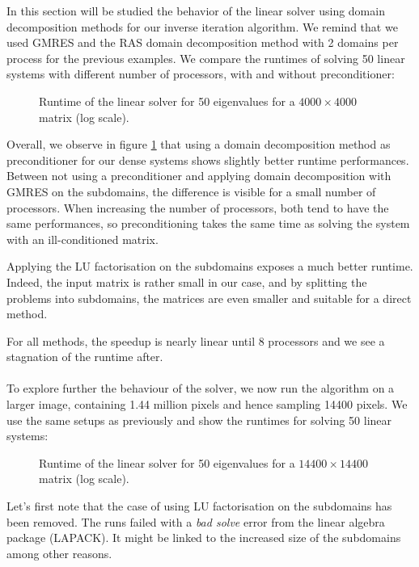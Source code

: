 In this section will be studied the behavior of the linear solver using domain decomposition methods for our inverse iteration algorithm.
We remind that we used GMRES and the RAS domain decomposition method with 2 domains per process for the previous examples.
We compare the runtimes of solving 50 linear systems with different number of processors, with and without preconditioner:

\begin{figure}[H]
 \centering
 
 \caption{Runtime of the linear solver for 50 eigenvalues for a \(4000 \times 4000\) matrix (log scale).}
 \label{fig:linear_solver}
\end{figure}

Overall, we observe in figure \ref{fig:linear_solver} that using a domain decomposition method as preconditioner for our dense systems shows slightly better runtime performances.
Between not using a preconditioner and applying domain decomposition with GMRES on the subdomains, the difference is visible for a small number of processors.
When increasing the number of processors, both tend to have the same performances, so preconditioning takes the same time as solving the system with an ill-conditioned matrix.

Applying the LU factorisation on the subdomains exposes a much better runtime.
Indeed, the input matrix is rather small in our case, and by splitting the problems into subdomains, the matrices are even smaller and suitable for a direct method.

For all methods, the speedup is nearly linear until 8 processors and we see a stagnation of the runtime after.

\paragraph{}
To explore further the behaviour of the solver, we now run the algorithm on a larger image, containing 1.44 million pixels and hence sampling 14400 pixels.
We use the same setups as previously and show the runtimes for solving 50 linear systems:

\begin{figure}[H]
 \centering
 
 \caption{Runtime of the linear solver for 50 eigenvalues for a \(14400 \times 14400\) matrix (log scale).}
 \label{fig:linear_solver_big}
\end{figure}

Let's first note that the case of using LU factorisation on the subdomains has been removed.
The runs failed with a \textit{bad solve} error from the linear algebra package (LAPACK).
It might be linked to the increased size of the subdomains among other reasons.

